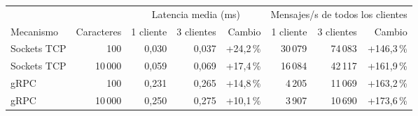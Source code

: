 \begin{tabular}{lrrrrrrr}
\toprule
 & & \multicolumn{3}{c}{Latencia media (ms)} & \multicolumn{3}{c}{Mensajes/s de todos los clientes} \\
\cmidrule(lr){3-5}\cmidrule(lr){6-8}
Mecanismo & Caracteres & 1 cliente & 3 clientes & Cambio & 1 cliente & 3 clientes & Cambio \\
\midrule
Sockets TCP & 100 & 0,030 & 0,037 & +24,2\,\% & 30\,079 & 74\,083 & +146,3\,\% \\
Sockets TCP & 10\,000 & 0,059 & 0,069 & +17,4\,\% & 16\,084 & 42\,117 & +161,9\,\% \\
gRPC & 100 & 0,231 & 0,265 & +14,8\,\% & 4\,205 & 11\,069 & +163,2\,\% \\
gRPC & 10\,000 & 0,250 & 0,275 & +10,1\,\% & 3\,907 & 10\,690 & +173,6\,\% \\
\bottomrule
\end{tabular}
